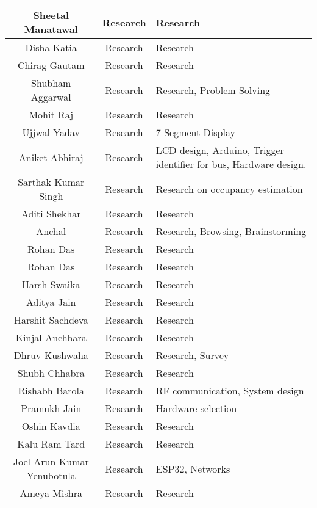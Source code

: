 \begin{center}
\begin{longtable}{ | c | c | m{6cm} | }
        \hline 
        Sheetal Manatawal & Research & Research\\ 
        \hline 
        Disha Katia & Research & Research\\ 
        \hline 
        Chirag Gautam & Research & Research\\ 
        \hline 
        Shubham Aggarwal & Research & Research, Problem Solving\\ 
        \hline 
        Mohit Raj & Research & Research\\ 
        \hline 
        Ujjwal Yadav & Research & 7 Segment Display\\ 
        \hline 
        Aniket Abhiraj & Research & LCD design, Arduino, Trigger identifier for bus, Hardware design.\\ 
        \hline 
        Sarthak Kumar Singh & Research & Research on occupancy estimation\\ 
        \hline 
        Aditi Shekhar & Research & Research\\ 
        \hline 
        Anchal & Research & Research, Browsing, Brainstorming\\ 
        \hline 
        Rohan Das & Research & Research\\ 
        \hline 
        Rohan Das & Research & Research\\ 
        \hline 
        Harsh Swaika & Research & Research\\ 
        \hline 
        Aditya Jain & Research & Research\\ 
        \hline 
        Harshit Sachdeva & Research & Research\\ 
        \hline 
        Kinjal Anchhara & Research & Research\\ 
        \hline 
        Dhruv Kushwaha & Research & Research, Survey\\ 
        \hline 
        Shubh Chhabra & Research & Research\\ 
        \hline 
        Rishabh Barola & Research & RF communication, System design\\ 
        \hline 
        Pramukh Jain & Research & Hardware selection\\ 
        \hline 
        Oshin Kavdia & Research & Research\\ 
        \hline 
        Kalu Ram Tard & Research & Research\\ 
        \hline 
        Joel Arun Kumar Yenubotula & Research & ESP32, Networks\\ 
        \hline 
        Ameya Mishra & Research & Research\\ 

\end{longtable}
\end{center}
